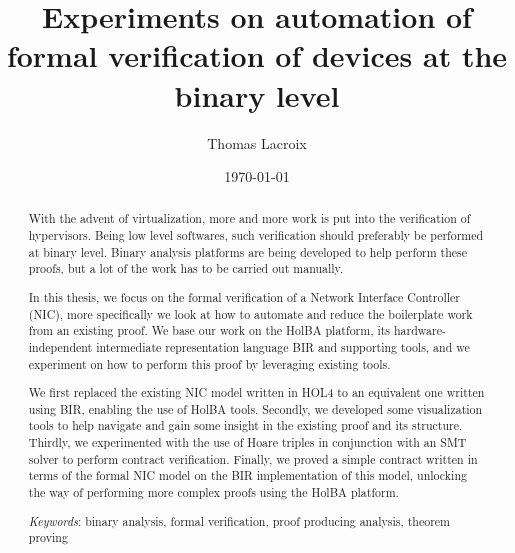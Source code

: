 \documentclass{kththesis}
\title{Experiments on automation of formal verification of devices at the binary level}
\author{Thomas Lacroix}
\date{\today}
\begin{document}
\frontmatter %

\titlepage

\begin{abstract}
  With the advent of virtualization, more and more work is put into the verification of hypervisors. Being low level softwares, such verification should preferably be performed at binary level. Binary analysis platforms are being developed to help perform these proofs, but a lot of the work has to be carried out manually.

  In this thesis, we focus on the formal verification of a Network Interface Controller (NIC), more specifically we look at how to automate and reduce the boilerplate work from an existing proof. We base our work on the HolBA platform, its hardware-independent intermediate representation language BIR and supporting tools, and we experiment on how to perform this proof by leveraging existing tools.

  We first replaced the existing NIC model written in HOL4 to an equivalent one written using BIR, enabling the use of HolBA tools. Secondly, we developed some visualization tools to help navigate and gain some insight in the existing proof and its structure. Thirdly, we experimented with the use of Hoare triples in conjunction with an SMT solver to perform contract verification. Finally, we proved a simple contract written in terms of the formal NIC model on the BIR implementation of this model, unlocking the way of performing more complex proofs using the HolBA platform.

  \textit{Keywords}: binary analysis, formal verification, proof producing analysis, theorem proving
\end{abstract}
\end{document}
